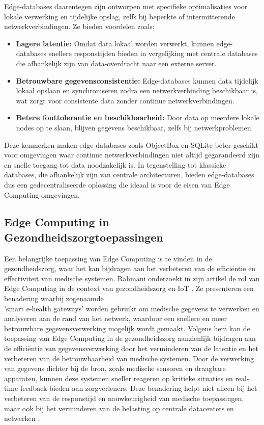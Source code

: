 Edge-databases daarentegen zijn ontworpen met specifieke optimalisaties voor lokale verwerking en tijdelijke opslag, zelfs bij beperkte of intermitterende netwerkverbindingen. Ze bieden voordelen zoals:
\begin{itemize}
    \item \textbf{Lagere latentie:} Omdat data lokaal worden verwerkt, kunnen edge-databases snellere responstijden bieden in vergelijking met centrale databases die afhankelijk zijn van data-overdracht naar een externe server.
    \item \textbf{Betrouwbare gegevensconsistentie:} Edge-databases kunnen data tijdelijk lokaal opslaan en synchroniseren zodra een netwerkverbinding beschikbaar is, wat zorgt voor consistente data zonder continue netwerkverbindingen.
    \item \textbf{Betere fouttolerantie en beschikbaarheid:} Door data op meerdere lokale nodes op te slaan, blijven gegevens beschikbaar, zelfs bij netwerkproblemen.
\end{itemize}

Deze kenmerken maken edge-databases zoals ObjectBox en SQLite beter geschikt voor omgevingen waar continue netwerkverbindingen niet altijd gegarandeerd zijn en snelle toegang tot data noodzakelijk is.
 In tegenstelling tot klassieke databases, die afhankelijk zijn van centrale architecturen, bieden edge-databases dus een gedecentraliseerde oplossing die ideaal is voor de eisen van Edge Computing-omgevingen.


\subsection{Edge Computing in Gezondheidszorgtoepassingen}

Een belangrijke toepassing van Edge Computing is te vinden in de gezondheidszorg, waar het kan bijdragen aan het verbeteren van de efficiëntie en effectiviteit van medische systemen. Rahmani onderzoekt in zijn artikel de rol van Edge Computing in de context van gezondheidszorg en IoT \autocite{Rahmani2018}.
 Ze presenteren een benadering waarbij zogenaamde \\ 'smart e-health gateways' worden gebruikt om medische gegevens te verwerken en analyseren aan de rand van het netwerk, waardoor een snellere en meer betrouwbare gegevensverwerking mogelijk wordt gemaakt.
Volgens hem kan de toepassing van Edge Computing in de gezondheidszorg aanzienlijk bijdragen aan de efficiëntie van gegevensverwerking door het verminderen van de latentie en het verbeteren van de betrouwbaarheid van medische systemen. 
 Door de verwerking van gegevens dichter bij de bron, zoals medische sensoren en draagbare apparaten, kunnen deze systemen sneller reageren op kritieke situaties en real-time feedback bieden aan zorgverleners.
Deze benadering helpt niet alleen bij het verbeteren van de responstijd en nauwkeurigheid van medische toepassingen, maar ook bij het verminderen van de belasting op centrale datacenters en netwerken \autocite{Rahmani2018}.
 
